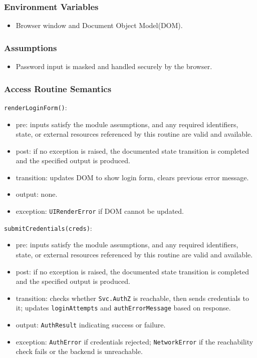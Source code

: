 \documentclass[12pt, titlepage]{article}
\begin{document}
\subsubsection{Environment Variables}
\begin{itemize}
    \item Browser window and Document Object Model(DOM).
\end{itemize}

\subsubsection{Assumptions}
\begin{itemize}
    \item Password input is masked and handled securely by the browser.
\end{itemize}

\subsubsection{Access Routine Semantics}

\noindent \texttt{renderLoginForm()}:
\begin{itemize}
    \item pre: inputs satisfy the module assumptions, and any required identifiers, state, or external resources referenced by this routine are valid and available.
    \item post: if no exception is raised, the documented state transition is completed and the specified output is produced.
    \item transition: updates DOM to show login form, clears previous error message.
    \item output: none.
    \item exception: \texttt{UIRenderError} if DOM cannot be updated.
\end{itemize}

\noindent \texttt{submitCredentials(creds)}:
\begin{itemize}
    \item pre: inputs satisfy the module assumptions, and any required identifiers, state, or external resources referenced by this routine are valid and available.
    \item post: if no exception is raised, the documented state transition is completed and the specified output is produced.
    \item transition: checks whether \texttt{Svc.AuthZ} is reachable, then sends credentials to it; updates \texttt{loginAttempts} and \texttt{authErrorMessage} based on response.
    \item output: \texttt{AuthResult} indicating success or failure.
    \item exception: \texttt{AuthError} if credentials rejected; \texttt{NetworkError} if the reachability check fails or the backend is unreachable.
\end{itemize}
\end{document}
